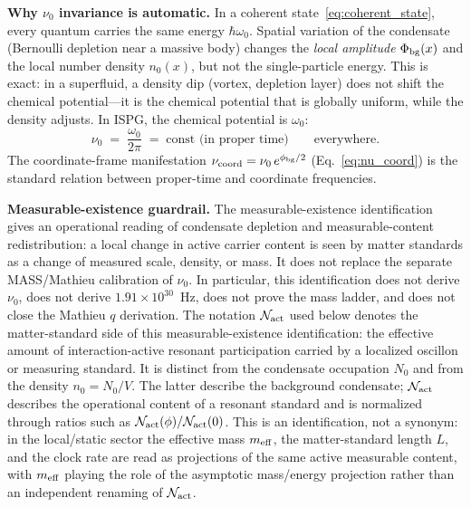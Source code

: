 \documentclass[11pt]{article}
\begin{document}
\medskip
\textbf{Why $\nu_0$ invariance is automatic.}
In a coherent state~\eqref{eq:coherent_state}, every
quantum carries the same energy $\hbar\omega_0$.
Spatial variation of the condensate (Bernoulli depletion
near a massive body) changes the \emph{local amplitude}
$\Phi_{\rm bg}(x)$ and the local number density $n_0(x)$,
but not the single-particle energy.  This is exact: in a
superfluid, a density dip (vortex, depletion layer) does
not shift the chemical potential---it is the chemical
potential that is globally uniform, while the density
adjusts.  In ISPG, the chemical potential is $\omega_0$:
\begin{equation}
  \nu_0 \;=\; \frac{\omega_0}{2\pi}
  \;=\; \text{const (in proper time)}
  \qquad\text{everywhere.}
  \label{eq:nu0_condensate}
\end{equation}
The coordinate-frame manifestation
$\nu_{\rm coord} = \nu_0\,e^{\phi_{\rm bg}/2}$
(Eq.~\ref{eq:nu_coord}) is the standard relation
between proper-time and coordinate frequencies.

\medskip
\textbf{Measurable-existence guardrail.}
The measurable-existence identification gives an operational reading of
condensate depletion and measurable-content redistribution: a local
change in active carrier content is seen by matter standards as a
change of measured scale, density, or mass.  It does not replace
the separate MASS/Mathieu calibration of $\nu_0$.  In particular,
this identification does not derive $\nu_0$, does not derive
$1.91\times 10^{30}$~Hz, does not prove the mass ladder, and does
not close the Mathieu $q$ derivation.
The notation $\mathcal N_{\rm act}$ used below denotes the matter-standard
side of this measurable-existence identification: the effective amount of
interaction-active resonant participation carried by a localized oscillon or
measuring standard.  It is distinct from the condensate occupation $N_0$ and
from the density $n_0=N_0/V$.  The latter describe the background condensate;
$\mathcal N_{\rm act}$ describes the operational content of a resonant
standard and is normalized through ratios such as
$\mathcal N_{\rm act}(\phi)/\mathcal N_{\rm act}(0)$.
This is an identification, not a synonym: in the local/static sector the
effective mass $m_{\rm eff}$, the matter-standard length $L$, and the clock
rate are read as projections of the same active measurable content, with
$m_{\rm eff}$ playing the role of the asymptotic mass/energy projection
rather than an independent renaming of $\mathcal N_{\rm act}$.
\end{document}
